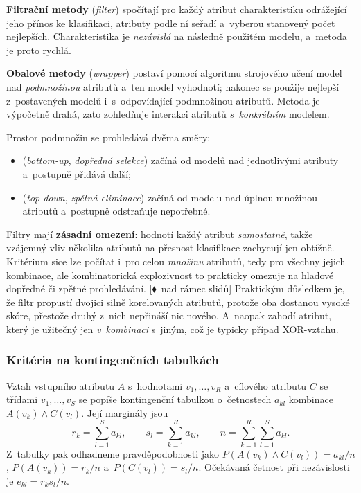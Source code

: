 \documentclass[11pt,a4paper]{article}
\theoremstyle{definition}
\newcommand{\mimo}{\textcolor{markcol}{\textsf{\footnotesize[$\blacklozenge$~nad rámec slidů]}}}
\begin{document}
\begin{defbox}
\textbf{Filtrační metody} (\emph{filter}) spočítají pro každý atribut charakteristiku
odrážející jeho přínos ke klasifikaci, atributy podle ní seřadí a~vyberou stanovený počet
nejlepších. Charakteristika je \emph{nezávislá} na následně použitém modelu, a~metoda je proto
rychlá.

\textbf{Obalové metody} (\emph{wrapper}) postaví pomocí algoritmu strojového učení model nad
\emph{podmnožinou} atributů a~ten model vyhodnotí; nakonec se použije nejlepší z~postavených
modelů i~s~odpovídající podmnožinou atributů. Metoda je výpočetně drahá, zato zohledňuje
interakci atributů \emph{s~konkrétním} modelem.

Prostor podmnožin se prohledává dvěma směry:
\begin{itemize}
\item {} (\emph{bottom-up}, \emph{dopředná selekce}) začíná od modelů nad
      jednotlivými atributy a~postupně přidává další;
\item {} (\emph{top-down}, \emph{zpětná eliminace}) začíná od modelu nad
      úplnou množinou atributů a~postupně odstraňuje nepotřebné.
\end{itemize}
\end{defbox}

Filtry mají \textbf{zásadní omezení}: hodnotí každý atribut \emph{samostatně}, takže vzájemný
vliv několika atributů na přesnost klasifikace zachycují jen obtížně. Kritérium sice lze
počítat i~pro celou \emph{množinu} atributů, tedy pro všechny jejich kombinace, ale
kombinatorická explozivnost to prakticky omezuje na hladové dopředné či zpětné prohledávání.
\mimo{} Praktickým důsledkem je, že filtr propustí dvojici silně korelovaných atributů,
protože oba dostanou vysoké skóre, přestože druhý z~nich nepřináší nic nového. A~naopak
zahodí atribut, který je užitečný jen \emph{v~kombinaci} s~jiným, což je typicky případ
XOR-vztahu.

\subsubsection{Kritéria na kontingenčních tabulkách}

Vztah vstupního atributu $A$ s~hodnotami $v_1,\dots,v_R$ a~cílového atributu $C$ se třídami
$v_1,\dots,v_S$ se popíše kontingenční tabulkou o~četnostech $a_{kl}$ kombinace
$A(v_k)\wedge C(v_l)$. Její marginály jsou
\[ r_k=\sum_{l=1}^{S}a_{kl},\qquad s_l=\sum_{k=1}^{R}a_{kl},\qquad
n=\sum_{k=1}^{R}\sum_{l=1}^{S}a_{kl}. \]
Z~tabulky pak odhadneme pravděpodobnosti jako $P(A(v_k)\wedge C(v_l))=a_{kl}/n$,
$P(A(v_k))=r_k/n$ a~$P(C(v_l))=s_l/n$. Očekávaná četnost při nezávislosti je
$e_{kl}=r_k s_l/n$.
\end{document}

